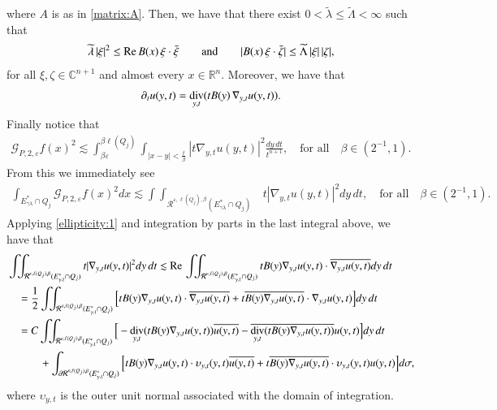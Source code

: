 \documentclass[11pt, a4paper,leqno]{amsart}
\theoremstyle{plain}
\theoremstyle{definition}
\theoremstyle{remark}
\numberwithin{equation}{section}
\def \R{ \mathbb{R} }
\def \Gcal { \mathcal{G} }
\def \iint{\int\!\!\!\int}
\def\div{\mathop{\rm div}}
\renewcommand{\Re}{{\rm Re}\,}
\begin{document}
where $A$ is as in \eqref{matrix:A}. Then, we have that
there exist
$0<\widetilde{\lambda}\le\widetilde{\Lambda}<\infty$ such that
\begin{align}\label{ellipticity:1}
\widetilde{\lambda}\,|\xi|^2
\le
\Re B(x)\,\xi\cdot\bar{\xi}
\qquad
\textrm{and}\qquad
|B(x)\,\xi\cdot \bar{\zeta}|
\le
\widetilde{\Lambda}\,|\xi|\,|\zeta|,
\end{align}
for all $\xi,\zeta\in\mathbb{C}^{n+1}$ and almost every $x\in \R^n$. Moreover, we have that
\begin{align}\label{div:B}
\partial_{t}u(y,t)
=
\div_{y,t}(tB(y)\,\nabla_{y,t}u(y,t)).
\end{align}
Finally notice that
\begin{align*}
\Gcal_{P,2,\varepsilon}f(x)^2
\lesssim 
\int_{\beta\varepsilon}^{\beta\ell(Q_j)}\int_{|x-y|<\frac{t}{\beta}}|t\nabla_{y,t}u(y,t)|^2\frac{dy\,dt}{t^{n+1}},\quad \textrm{for all}\quad \beta\in (2^{-1},1).
\end{align*}
From this we immediately see
\begin{align}\label{GP2-epsilon}
\int_{E^*_{\gamma\lambda}\cap Q_j}\Gcal_{P,2,\varepsilon}f(x)^2dx
\lesssim 
\iint_{\mathcal{R}^{\varepsilon,\ell(Q_j),\beta}(E^*_{\gamma\lambda}\cap Q_j)}&t|\nabla_{y,t}u(y,t)|^2 dy\,dt,\quad \textrm{for all}\quad \beta\in (2^{-1},1).
\end{align}
Applying \eqref{ellipticity:1} and  integration by parts in the last integral above, we have that
\begin{align*}
&\iint_{\mathcal{R}^{\varepsilon,\ell(Q_j),\beta}(E^*_{\gamma\lambda}\cap Q_j)}t|\nabla_{y,t}u(y,t)|^2 dy\,dt
\lesssim \Re
\iint_{\mathcal{R}^{\varepsilon,\ell(Q_j),\beta}(E^*_{\gamma\lambda}\cap Q_j)}tB(y)\nabla_{y,t}u(y,t)\cdot \overline{\nabla_{y,t}u(y,t)} dy\,dt
\\
&\quad
=\frac{1}{2}
 \iint_{\mathcal{R}^{\varepsilon,\ell(Q_j),\beta}(E^*_{\gamma\lambda}\cap Q_j)}\Big[tB(y)\nabla_{y,t}u(y,t)\cdot \overline{\nabla_{y,t}u(y,t)}+ t\overline{B(y)\nabla_{y,t}u(y,t)}\cdot \nabla_{y,t}u(y,t)\Big] dy\,dt
\\
&\quad
=C \iint_{\mathcal{R}^{\varepsilon,\ell(Q_j),\beta}(E^*_{\gamma\lambda}\cap Q_j)}\Big[-\div_{y,t}(tB(y)\nabla_{y,t}u(y,t)) \overline{u(y,t)}- \overline{\div_{y,t}(tB(y)\nabla_{y,t}u(y,t))} u(y,t)\Big] dy\,dt
\\
&\quad \qquad
+ \int_{\partial \mathcal{R}^{\varepsilon,\ell(Q_j),\beta}(E^*_{\gamma\lambda}\cap Q_j)}\Big[tB(y)\nabla_{y,t}u(y,t)\cdot \upsilon_{y,t}(y,t)\overline{u(y,t)}+ t\overline{B(y)\nabla_{y,t}u(y,t)}\cdot \upsilon_{y,t}(y,t)u(y,t)\Big] d\sigma,
\end{align*}
where $\upsilon_{y,t}$ is the outer unit normal associated with the domain of integration.
\end{document}
